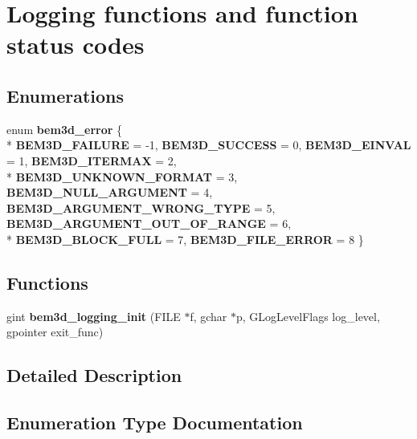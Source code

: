 \section{Logging functions and function status codes}
\label{group__logging}
\subsection*{Enumerations}
\begin{DoxyCompactItemize}
\item 
enum {\bf bem3d\+\_\+error} \{ \\*
{\bfseries B\+E\+M3\+D\+\_\+\+F\+A\+I\+L\+U\+R\+E} = -\/1, 
{\bfseries B\+E\+M3\+D\+\_\+\+S\+U\+C\+C\+E\+S\+S} = 0, 
{\bfseries B\+E\+M3\+D\+\_\+\+E\+I\+N\+V\+A\+L} = 1, 
{\bfseries B\+E\+M3\+D\+\_\+\+I\+T\+E\+R\+M\+A\+X} = 2, 
\\*
{\bfseries B\+E\+M3\+D\+\_\+\+U\+N\+K\+N\+O\+W\+N\+\_\+\+F\+O\+R\+M\+A\+T} = 3, 
{\bfseries B\+E\+M3\+D\+\_\+\+N\+U\+L\+L\+\_\+\+A\+R\+G\+U\+M\+E\+N\+T} = 4, 
{\bfseries B\+E\+M3\+D\+\_\+\+A\+R\+G\+U\+M\+E\+N\+T\+\_\+\+W\+R\+O\+N\+G\+\_\+\+T\+Y\+P\+E} = 5, 
{\bfseries B\+E\+M3\+D\+\_\+\+A\+R\+G\+U\+M\+E\+N\+T\+\_\+\+O\+U\+T\+\_\+\+O\+F\+\_\+\+R\+A\+N\+G\+E} = 6, 
\\*
{\bfseries B\+E\+M3\+D\+\_\+\+B\+L\+O\+C\+K\+\_\+\+F\+U\+L\+L} = 7, 
{\bfseries B\+E\+M3\+D\+\_\+\+F\+I\+L\+E\+\_\+\+E\+R\+R\+O\+R} = 8
 \}
\end{DoxyCompactItemize}
\subsection*{Functions}
\begin{DoxyCompactItemize}
\item 
gint {\bf bem3d\+\_\+logging\+\_\+init} (F\+I\+L\+E $\ast$f, gchar $\ast$p, G\+Log\+Level\+Flags log\+\_\+level, gpointer exit\+\_\+func)
\end{DoxyCompactItemize}


\subsection{Detailed Description}


\subsection{Enumeration Type Documentation}
